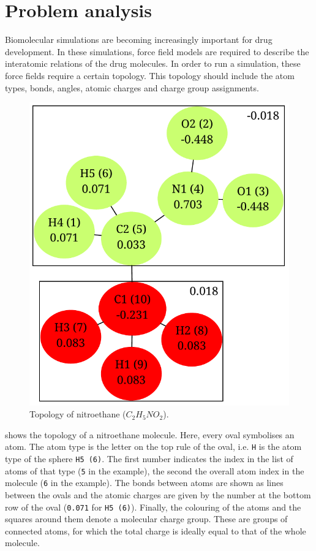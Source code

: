 \chapter{Problem analysis}

Biomolecular simulations are becoming increasingly important for drug development. In these simulations, force field models are required to describe the interatomic relations of the drug molecules. In order to run a simulation, these force fields require a certain topology. This topology should include the atom types, bonds, angles, atomic charges and charge group assignments.


\begin{figure}[h!]
\begin{center}
\includegraphics[width=.4\textwidth]{img/partial_charges.pdf}
\caption{Topology of nitroethane ($C_{2}H_{5}NO_{2}$).}
\end{center}
\end{figure}

 shows the topology of a nitroethane molecule. Here, every oval symbolises an atom. The atom type is the letter on the top rule of the oval, i.e. \verb|H| is the atom type of the sphere \verb|H5 (6)|. The first number indicates the index in the list of atoms of that type (\verb|5| in the example), the second the overall atom index in the molecule (\verb|6| in the example). The bonds between atoms are shown as lines between the ovals and the atomic charges are given by the number at the bottom row of the oval (\verb|0.071| for \verb|H5 (6)|). Finally, the colouring of the atoms and the squares around them denote a molecular charge group. These are groups of connected atoms, for which the total charge is ideally equal to that of the whole molecule.

